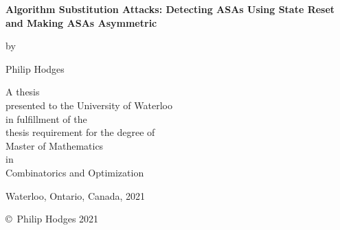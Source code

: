 \pagestyle{empty}

\begin{titlepage}
        \begin{center}
        \vspace*{1.0cm}

        \Huge
        {\bf Algorithm Substitution Attacks: Detecting ASAs Using State Reset and Making ASAs Asymmetric}

        \vspace*{1.0cm}

        \normalsize
        by \\

        \vspace*{1.0cm}

        \Large
        Philip Hodges \\

        \vspace*{3.0cm}

        \normalsize
        A thesis \\
        presented to the University of Waterloo \\ 
        in fulfillment of the \\
        thesis requirement for the degree of \\
        Master of Mathematics \\
        in \\
        Combinatorics and Optimization \\

        \vspace*{2.0cm}

        Waterloo, Ontario, Canada, 2021 \\

        \vspace*{1.0cm}

        \copyright\ Philip Hodges 2021 \\
        \end{center}
\end{titlepage}

\pagestyle{plain}
\setcounter{page}{2}

